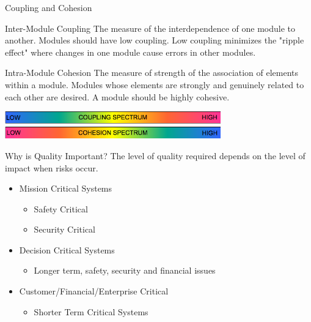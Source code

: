 \documentclass[aspectratio=1610,xcolor=dvipsnames,t,compress]{beamer}
\begin{document}
\begin{frame}{Coupling and Cohesion} 
    \begin{block}{Inter-Module Coupling} 
        The measure of the interdependence of one module to another. 
        Modules should have low coupling. 
        Low coupling minimizes the "ripple effect" where changes 
        in one module cause errors in other modules. 
    \end{block} 

    \begin{block}{Intra-Module Cohesion} 
        The measure of strength of the association of elements within a module. 
        Modules whose elements are strongly and genuinely related to 
        each other are desired. A module should be highly cohesive. 
    \end{block} 

    \begin{center}
        \includegraphics[width=0.7\textwidth]{images/spectra} 
    \end{center}

\end{frame} 

\begin{frame}{Why is Quality Important?}
    The level of quality required depends on the level of impact when risks
    occur.
    \begin{itemize}
        \item Mission Critical Systems
        \begin{itemize}
            \item Safety Critical
            \item Security Critical
        \end{itemize}
        \item Decision Critical Systems 
        \begin{itemize} 
            \item Longer term, safety, security and financial issues
        \end{itemize}
        \item Customer/Financial/Enterprise Critical
        \begin{itemize}
            \item Shorter Term Critical Systems
        \end{itemize} 
    \end{itemize}
\end{frame}
\end{document}
